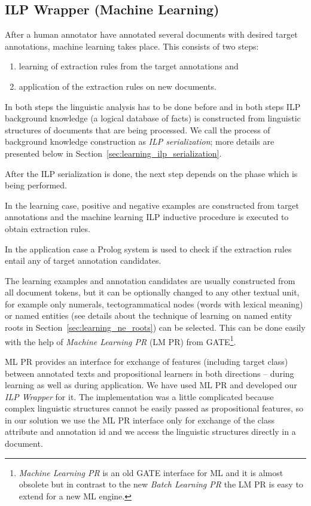 \subsection{ILP Wrapper (Machine Learning)} \label{sec:learning_ilp_wrapper}
After a human annotator have annotated several documents with desired target annotations, machine learning takes place. 
This consists of two steps: 
\begin{enumerate}
	\item learning of extraction rules from the target annotations and
	\item application of the extraction rules on new documents.
\end{enumerate}
In both steps the linguistic analysis has to be done before and in both steps ILP background knowledge (a logical database of facts) is constructed from linguistic structures of documents that are being processed. We call the process of background knowledge construction as \emph{ILP serialization}; more details are presented below in Section~\ref{sec:learning_ilp_serialization}.

After the ILP serialization is done, the next step depends on the phase which is being performed.

In the learning case, positive and negative examples are constructed from target annotations and the machine learning ILP inductive procedure is executed to obtain extraction rules.

In the application case a Prolog system is used to check if the extraction rules entail any of target annotation candidates.




The learning examples and annotation candidates are usually constructed from all document tokens, but it can be optionally changed to any other textual unit, for example only numerals, tectogrammatical nodes (words with lexical meaning) or named entities (see details about the technique of learning on named entity roots in Section~\ref{sec:learning_ne_roots}) can be selected. This can be done easily with the help of \emph{Machine Learning PR} (LM PR) from GATE\footnote{\emph{Machine Learning PR} is an old GATE interface for ML and it is almost obsolete but in contrast to the new \emph{Batch Learning PR} the LM PR is easy to extend for a new ML engine.}.

ML PR provides an interface for exchange of features (including target class) between annotated texts and propositional learners in both directions -- during learning as well as during application. We have used ML PR and developed our \emph{ILP Wrapper} for it. The implementation was a little complicated because complex linguistic structures cannot be easily passed as propositional features, so in our solution we use the ML PR interface only for exchange of the class attribute and annotation id and we access the linguistic structures directly in a document.



